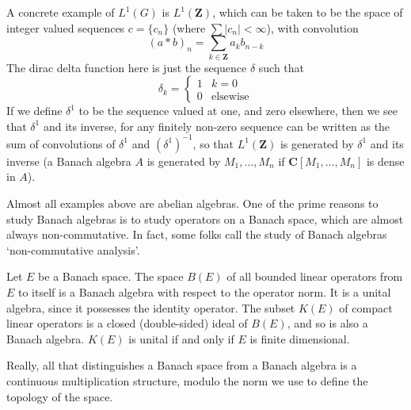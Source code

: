 \begin{example}
    A concrete example of $L^1(G)$ is $L^1(\mathbf{Z})$, which can be taken to be the space of integer valued sequences $c = \{ c_n \}$ (where $\sum |c_n| < \infty$), with convolution
    \[ (a * b)_n = \sum_{k \in \mathbf{Z}} a_k b_{n-k} \]
    The dirac delta function here is just the sequence $\delta$ such that
    \[ \delta_k = \begin{cases} 1 & k = 0 \\ 0 & \text{elsewise} \end{cases} \]
    If we define $\delta^1$ to be the sequence valued at one, and zero elsewhere, then we see that $\delta^1$ and its inverse, for any finitely non-zero sequence can be written as the sum of convolutions of $\delta^1$ and $(\delta^1)^{-1}$, so that $L^1(\mathbf{Z})$ is generated by $\delta^1$ and its inverse (a Banach algebra $A$ is generated by $M_1, \dots, M_n$ if $\mathbf{C}[M_1, \dots, M_n]$ is dense in $A$).
\end{example}

Almost all examples above are abelian algebras. One of the prime reasons to study Banach algebras is to study operators on a Banach space, which are almost always non-commutative. In fact, some folks call the study of Banach algebras `non-commutative analysis'.

\begin{example}
    Let $E$ be a Banach space. The space $B(E)$ of all bounded linear operators from $E$ to itself is a Banach algebra with respect to the operator norm. It is a unital algebra, since it possesses the identity operator. The subset $K(E)$ of compact linear operators is a closed (double-sided) ideal of $B(E)$, and so is also a Banach algebra. $K(E)$ is unital if and only if $E$ is finite dimensional.
\end{example}

Really, all that distinguishes a Banach space from a Banach algebra is a continuous multiplication structure, modulo the norm we use to define the topology of the space.

